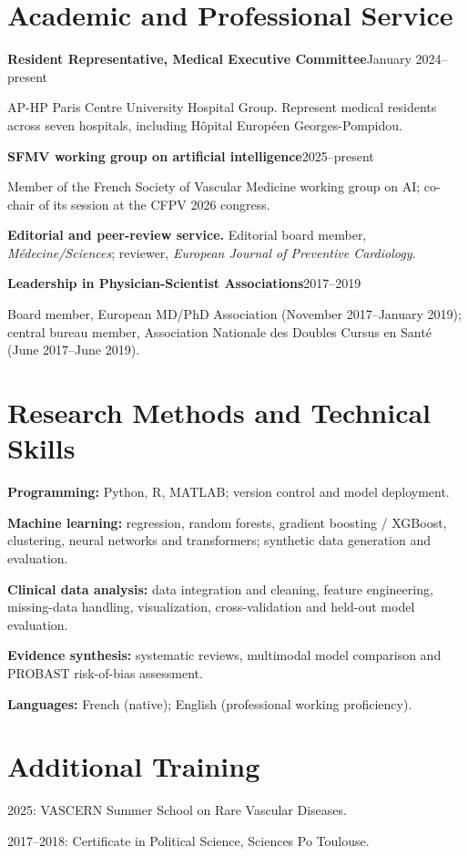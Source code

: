 \documentclass[10pt,letterpaper]{article}
\newcommand{\entry}[2]{\par\vspace{5pt}\noindent\textbf{#1}\hfill{\sffamily\small\color{muted}#2}\par\vspace{1pt}}
\begin{document}
\section{Academic and Professional Service}
\entry{Resident Representative, Medical Executive Committee}{January 2024--present}
AP-HP Paris Centre University Hospital Group. Represent medical residents across seven hospitals, including Hôpital Européen Georges-Pompidou.
\entry{SFMV working group on artificial intelligence}{2025--present}
Member of the French Society of Vascular Medicine working group on AI; co-chair of its session at the CFPV 2026 congress.
\par\vspace{5pt}
\textbf{Editorial and peer-review service.} Editorial board member, \textit{Médecine/Sciences}; reviewer, \textit{European Journal of Preventive Cardiology}.
\entry{Leadership in Physician-Scientist Associations}{2017--2019}
Board member, European MD/PhD Association (November 2017--January 2019); central bureau member, Association Nationale des Doubles Cursus en Santé (June 2017--June 2019).

\section{Research Methods and Technical Skills}
\textbf{Programming:} Python, R, MATLAB; version control and model deployment.\par\vspace{2pt}
\textbf{Machine learning:} regression, random forests, gradient boosting / XGBoost, clustering, neural networks and transformers; synthetic data generation and evaluation.\par\vspace{2pt}
\textbf{Clinical data analysis:} data integration and cleaning, feature engineering, missing-data handling, visualization, cross-validation and held-out model evaluation.\par\vspace{2pt}
\textbf{Evidence synthesis:} systematic reviews, multimodal model comparison and PROBAST risk-of-bias assessment.\par\vspace{2pt}
\textbf{Languages:} French (native); English (professional working proficiency).

\section{Additional Training}
2025: VASCERN Summer School on Rare Vascular Diseases.\par
2017--2018: Certificate in Political Science, Sciences Po Toulouse.
\end{document}
